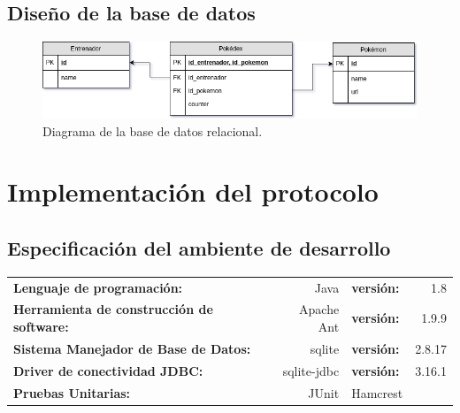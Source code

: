 \documentclass[12pt]{article}
\begin{document}
\subsection{Diseño de la base de datos}
 \begin{figure}[H]
   \centering
   \includegraphics[width=1\textwidth]{PokeDB2}
   \caption{Diagrama de la base de datos relacional.}
 \end{figure}

\section{Implementación del protocolo}
\subsection{Especificación del ambiente de desarrollo}
\begin{tabular}{l r l r}
  \textbf{Lenguaje de programación:} & Java & \textbf{versión:} & 1.8 \\
  \textbf{Herramienta de construcción de software:} & Apache Ant & \textbf{versión:} & 1.9.9 \\
  \textbf{Sistema Manejador de Base de Datos:} & sqlite & \textbf{versión:} & 2.8.17 \\
  \textbf{Driver de conectividad JDBC:} & sqlite-jdbc & \textbf{versión:}& 3.16.1\\
  \textbf{Pruebas Unitarias:} & JUnit & Hamcrest \\
\end{tabular}
\end{document}
